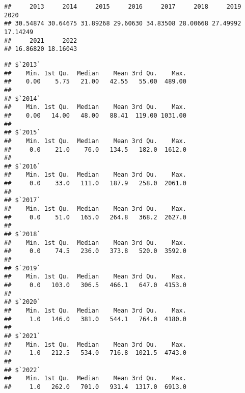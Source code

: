 \documentclass[
]{article}
\newenvironment{Shaded}{\begin{snugshade}}{\end{snugshade}}
\newcommand{\AttributeTok}[1]{\textcolor[rgb]{0.13,0.29,0.53}{#1}}
\newcommand{\ConstantTok}[1]{\textcolor[rgb]{0.56,0.35,0.01}{#1}}
\newcommand{\FunctionTok}[1]{\textcolor[rgb]{0.13,0.29,0.53}{\textbf{#1}}}
\newcommand{\NormalTok}[1]{#1}
\newcommand{\SpecialCharTok}[1]{\textcolor[rgb]{0.81,0.36,0.00}{\textbf{#1}}}
\begin{document}
\begin{Shaded}
\end{Shaded}

\begin{verbatim}
##     2013     2014     2015     2016     2017     2018     2019     2020 
## 30.54874 30.64675 31.89268 29.60630 34.83508 28.00668 27.49992 17.14249 
##     2021     2022 
## 16.86820 18.16043
\end{verbatim}

\begin{Shaded}
\end{Shaded}

\begin{verbatim}
## $`2013`
##    Min. 1st Qu.  Median    Mean 3rd Qu.    Max. 
##    0.00    5.75   21.00   42.55   55.00  489.00 
## 
## $`2014`
##    Min. 1st Qu.  Median    Mean 3rd Qu.    Max. 
##    0.00   14.00   48.00   88.41  119.00 1031.00 
## 
## $`2015`
##    Min. 1st Qu.  Median    Mean 3rd Qu.    Max. 
##     0.0    21.0    76.0   134.5   182.0  1612.0 
## 
## $`2016`
##    Min. 1st Qu.  Median    Mean 3rd Qu.    Max. 
##     0.0    33.0   111.0   187.9   258.0  2061.0 
## 
## $`2017`
##    Min. 1st Qu.  Median    Mean 3rd Qu.    Max. 
##     0.0    51.0   165.0   264.8   368.2  2627.0 
## 
## $`2018`
##    Min. 1st Qu.  Median    Mean 3rd Qu.    Max. 
##     0.0    74.5   236.0   373.8   520.0  3592.0 
## 
## $`2019`
##    Min. 1st Qu.  Median    Mean 3rd Qu.    Max. 
##     0.0   103.0   306.5   466.1   647.0  4153.0 
## 
## $`2020`
##    Min. 1st Qu.  Median    Mean 3rd Qu.    Max. 
##     1.0   146.0   381.0   544.1   764.0  4180.0 
## 
## $`2021`
##    Min. 1st Qu.  Median    Mean 3rd Qu.    Max. 
##     1.0   212.5   534.0   716.8  1021.5  4743.0 
## 
## $`2022`
##    Min. 1st Qu.  Median    Mean 3rd Qu.    Max. 
##     1.0   262.0   701.0   931.4  1317.0  6913.0
\end{verbatim}
\end{document}
